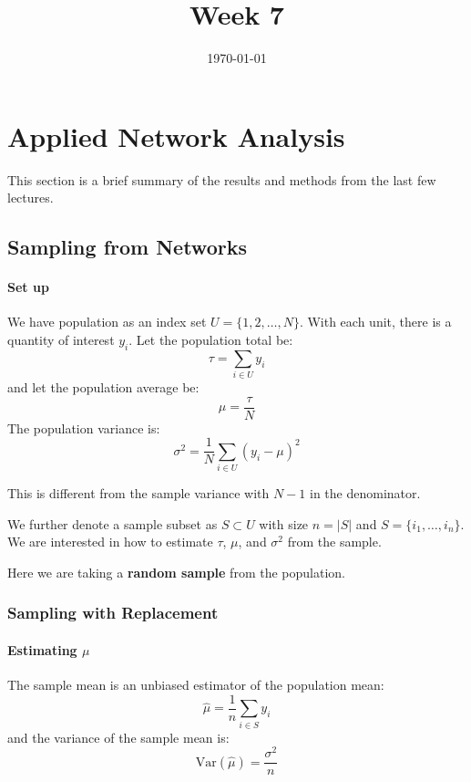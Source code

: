 \documentclass{article}
\title{Week 7}
\date{\today}
\begin{document}
\maketitle
\section{Applied Network Analysis}
This section is a brief summary of the results and methods from the last few lectures.

\subsection{Sampling from Networks}
\paragraph{Set up} We have population as an index set $U=\{1,2,\ldots, N\}$. With each unit, there is a quantity of interest $y_i$. Let the population total be:
\begin{equation}
    \tau = \sum_{i\in U} y_i
\end{equation}
and let the population average be:
\begin{equation}
    \mu = \frac{\tau}{N}
\end{equation}
The population variance is:
\begin{equation}
    \sigma^2 = \frac{1}{N}\sum_{i\in U} (y_i-\mu)^2
\end{equation}

\begin{remark}
    This is different from the sample variance with $N-1$ in the denominator.
\end{remark}

We further denote a sample subset as $S\subset U$ with size $n=|S|$ and $S=\{i_1, \ldots, i_n\}$. We are interested in how to estimate $\tau$,  $\mu$, and $\sigma^2$ from the sample.

\begin{remark}
    Here we are taking a \textbf{random sample} from the population.   
\end{remark}

\subsubsection{Sampling with Replacement}

\paragraph{Estimating $\mu$} The sample mean is an unbiased estimator of the population mean: 
\begin{equation}
    \hat{\mu} = \frac{1}{n}\sum_{i\in S} y_i
\end{equation}
and the variance of the sample mean is:
\begin{equation}\label{eq:var_sample_mean}
    \mathrm{Var}(\hat{\mu}) = \frac{\sigma^2}{n}
\end{equation}
\end{document}

